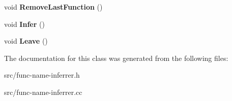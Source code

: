 \begin{DoxyCompactItemize}
\item 
\hypertarget{classv8_1_1internal_1_1_func_name_inferrer_abc2f4a37cc46c2a8208475fb883db140}{}void {\bfseries Remove\+Last\+Function} ()\label{classv8_1_1internal_1_1_func_name_inferrer_abc2f4a37cc46c2a8208475fb883db140}

\item 
\hypertarget{classv8_1_1internal_1_1_func_name_inferrer_a7b3044baeb6bda1f317048e80dd2a8e9}{}void {\bfseries Infer} ()\label{classv8_1_1internal_1_1_func_name_inferrer_a7b3044baeb6bda1f317048e80dd2a8e9}

\item 
\hypertarget{classv8_1_1internal_1_1_func_name_inferrer_a2c2f99c7b0c11c4ffa389e919177377f}{}void {\bfseries Leave} ()\label{classv8_1_1internal_1_1_func_name_inferrer_a2c2f99c7b0c11c4ffa389e919177377f}

\end{DoxyCompactItemize}


The documentation for this class was generated from the following files\+:\begin{DoxyCompactItemize}
\item 
src/func-\/name-\/inferrer.\+h\item 
src/func-\/name-\/inferrer.\+cc\end{DoxyCompactItemize}
